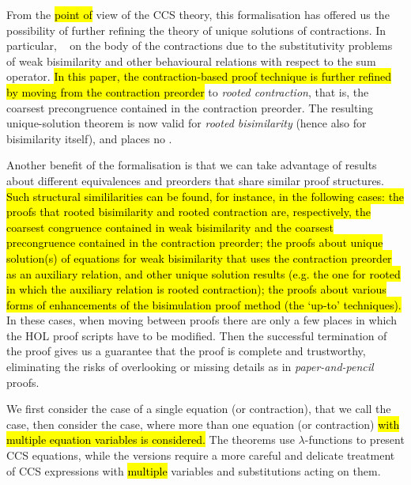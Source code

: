 From the \hl{point of} view of the CCS theory, this formalisation has offered us the possibility of
further refining the theory of unique solutions of contractions.
In particular, ~\cite{sangiorgi2017equations}  on the body of the contractions due to the
substitutivity problems of weak bisimilarity and other behavioural relations with respect
to the sum operator.
\hl{In this paper, the contraction-based proof technique is further
refined by moving from the contraction preorder} to
\emph{rooted contraction}, that is, the coarsest precongruence contained in the contraction
preorder. The resulting unique-solution theorem is now valid for
\emph{rooted bisimilarity} (hence also for bisimilarity itself), and places no 
.

Another benefit of the formalisation is 
that we can take advantage of results about different 
equivalences and preorders that share similar proof structures.
\hl{Such structural simililarities can be found, for instance, in the
following cases: the proofs that rooted bisimilarity and rooted
contraction are, respectively, the coarsest congruence contained in
weak bisimilarity and the coarsest precongruence contained in the
contraction preorder; the proofs about unique solution(s) of equations
for weak bisimilarity that uses the contraction preorder as an
auxiliary relation, and other unique solution results (e.g. the one
for rooted in which the auxiliary relation is rooted contraction); the
proofs about various forms of enhancements of the bisimulation proof
method (the `up-to' techniques).}
%
In these cases, when moving between proofs there are only a few places in
which the HOL proof scripts have to be modified.
Then the successful termination of the proof gives us a guarantee that the proof is
complete and trustworthy, eliminating the risks 
of overlooking or missing details as in \emph{paper-and-pencil} proofs.

We first consider the case of a single equation (or contraction),
that we call the \univariate case, then consider the \multivariate
  case, where  more than one equation
  (or contraction) \hl{with multiple equation variables is considered.}
The \univariate theorems use
$\lambda$-functions to present CCS equations,
while the \multivariate versions require a
more careful and delicate treatment of CCS
expressions with \hl{multiple} variables and substitutions acting on them.

